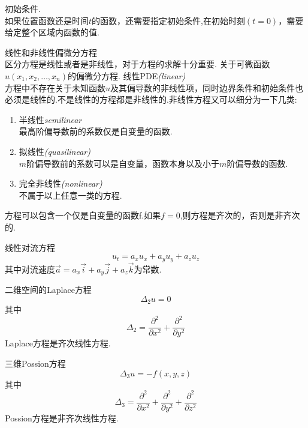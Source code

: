 	\begin{mydef}
		初始条件.\\
		如果位置函数还是时间$t$的函数，还需要指定初始条件,在初始时刻$(t=0)$，需要给定整个区域内函数的值.
	\end{mydef}
	\begin{mydef}
		线性和非线性偏微分方程\\
		区分方程是线性或者是非线性，对于方程的求解十分重要.
		关于可微函数$u(x_1,x_2,\ldots,x_n)$的偏微分方程.
		 线性PDE\emph{(linear)}\\
		方程中不存在关于未知函数$u$及其偏导数的非线性项，同时边界条件和初始条件也必须是线性的.不是线性的方程都是非线性的.非线性方程又可以细分为一下几类:
		\begin{enumerate}[(1)]
			\item 半线性\emph{semilinear}\\
			最高阶偏导数前的系数仅是自变量的函数.
			\item 拟线性\emph{(quasilinear)}\\
			$m$阶偏导数前的系数可以是自变量，函数本身以及小于$m$阶偏导数的函数.
			\item 完全非线性\emph{(nonlinear)}\\
			不属于以上任意一类的方程.
		\end{enumerate}
	\end{mydef}	
	
	\begin{mydef}
		方程可以包含一个仅是自变量的函数f.如果$f=0$,则方程是齐次的，否则是非齐次的.
	\end{mydef}

	\begin{myexample}
		线性对流方程
		\begin{equation}
			u_t = a_x u_x + a_y u_y + a_z u_z
		\end{equation}
		其中对流速度$\vec{a}=a_x \vec{i} + a_y \vec{j} + a_z \vec{k}$为常数.
	\end{myexample}

	\begin{myexample}
		二维空间的Laplace方程
		\begin{equation}
			\Delta_2 u = 0
		\end{equation}
		其中
		\[\Delta_2 = \frac{\partial^2}{\partial x^2} + \frac{\partial^2}{\partial y^2}\]
		Laplace方程是齐次线性方程.
	\end{myexample}
		
	\begin{myexample}
		三维Possion方程
		\begin{equation}
			\Delta_3 u = -f(x,y,z)
		\end{equation}
		其中
		\[\Delta_3 = \frac{\partial^2}{\partial x^2} + \frac{\partial^2}{\partial y^2} + \frac{\partial^2}{\partial z^2}\]	
		Possion方程是非齐次线性方程.	
	\end{myexample}

